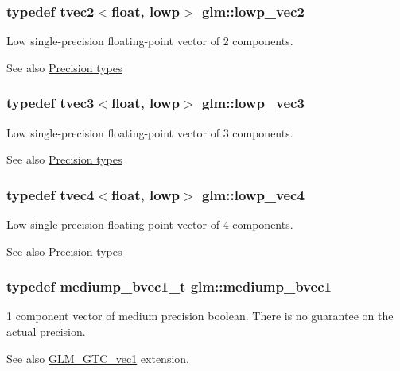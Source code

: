 \subsubsection[{lowp\+\_\+vec2}]{\setlength{\rightskip}{0pt plus 5cm}typedef tvec2$<$float, lowp$>$ {\bf glm\+::lowp\+\_\+vec2}}\label{namespaceglm_aaa6feab0c0e87cd19c19afc24c807720}
Low single-\/precision floating-\/point vector of 2 components. \begin{DoxySeeAlso}{See also}
\hyperlink{group__core__precision}{Precision types} 
\end{DoxySeeAlso}
\hypertarget{namespaceglm_aca2a956a73b6aca282fa361a1cbedcc3}{}
\subsubsection[{lowp\+\_\+vec3}]{\setlength{\rightskip}{0pt plus 5cm}typedef tvec3$<$float, lowp$>$ {\bf glm\+::lowp\+\_\+vec3}}\label{namespaceglm_aca2a956a73b6aca282fa361a1cbedcc3}
Low single-\/precision floating-\/point vector of 3 components. \begin{DoxySeeAlso}{See also}
\hyperlink{group__core__precision}{Precision types} 
\end{DoxySeeAlso}
\hypertarget{namespaceglm_a6ad6a0095c935cb38e0899ffd70bf739}{}
\subsubsection[{lowp\+\_\+vec4}]{\setlength{\rightskip}{0pt plus 5cm}typedef tvec4$<$float, lowp$>$ {\bf glm\+::lowp\+\_\+vec4}}\label{namespaceglm_a6ad6a0095c935cb38e0899ffd70bf739}
Low single-\/precision floating-\/point vector of 4 components. \begin{DoxySeeAlso}{See also}
\hyperlink{group__core__precision}{Precision types} 
\end{DoxySeeAlso}
\hypertarget{namespaceglm_a6c2cab6a7010331621a5ce656dd5f58d}{}
\subsubsection[{mediump\+\_\+bvec1}]{\setlength{\rightskip}{0pt plus 5cm}typedef mediump\+\_\+bvec1\+\_\+t {\bf glm\+::mediump\+\_\+bvec1}}\label{namespaceglm_a6c2cab6a7010331621a5ce656dd5f58d}
1 component vector of medium precision boolean. There is no guarantee on the actual precision. \begin{DoxySeeAlso}{See also}
\hyperlink{group__gtc__vec1}{G\+L\+M\+\_\+\+G\+T\+C\+\_\+vec1} extension. 
\end{DoxySeeAlso}
\hypertarget{namespaceglm_ae5feb45196f5e0d2b4e61873a08771f5}{}
